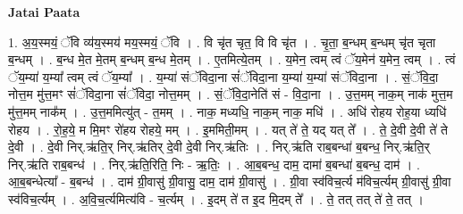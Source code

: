 \documentclass[17pt]{extarticle}
\begin{document}
\textbf{Jatai Paata} \newline

1. अ॒य॒स्मयं॒ ॅवि व्य॑य॒स्मय॑ मय॒स्मयं॒ ॅवि । . वि चृ॑त चृत॒ वि वि चृ॑त । . चृ॒ता॒ ब॒न्धम् ब॒न्धम् चृ॑त चृता ब॒न्धम् । . ब॒न्ध मे॒त मे॒तम् ब॒न्धम् ब॒न्ध मे॒तम् । . ए॒तमित्ये॒तम् । . य॒मेन॒ त्वम् त्वं ॅय॒मेन॑ य॒मेन॒ त्वम् । . त्वं ॅय॒म्या॑ य॒म्या᳚ त्वम् त्वं ॅय॒म्या᳚ । . य॒म्या॑ संॅविदा॒ना सं॑ॅविदा॒ना य॒म्या॑ य॒म्या॑ संॅविदा॒ना । . सं॒ॅवि॒दा॒ नोत्त॒म मु॑त्त॒मꣳ सं॑ॅविदा॒ना सं॑ॅविदा॒ नोत्त॒मम् । . सं॒ॅवि॒दा॒नेति॑ सं - वि॒दा॒ना । . उ॒त्त॒मम् नाक॒म् नाक॑ मुत्त॒म मु॑त्त॒मम् नाक᳚म् । . उ॒त्त॒ममित्यु॑त् - त॒मम् । . नाक॒ मध्यधि॒ नाक॒म् नाक॒ मधि॑ । . अधि॑ रोहय रोह॒या ध्यधि॑ रोहय । . रो॒ह॒ये॒ म मि॒मꣳ रो॑हय रोहये॒ मम् । . इ॒ममिती॒मम् । . यत् ते॑ ते॒ यद् यत् ते᳚ । . ते॒ दे॒वी दे॒वी ते॑ ते दे॒वी । . दे॒वी निर्.ऋ॑ति॒र् निर्.ऋ॑तिर् दे॒वी दे॒वी निर्.ऋ॑तिः । . निर्.ऋ॑ति राब॒बन्धा॑ ब॒बन्ध॒ निर्.ऋ॑ति॒र् निर्.ऋ॑ति राब॒बन्ध॑ । . निर्.ऋ॑ति॒रिति॒ निः - ऋ॒तिः॒ । . आ॒ब॒बन्ध॒ दाम॒ दामा॑ ब॒बन्धा॑ ब॒बन्ध॒ दाम॑ । . आ॒ब॒बन्धेत्या᳚ - ब॒बन्ध॑ । . दाम॑ ग्री॒वासु॑ ग्री॒वासु॒ दाम॒ दाम॑ ग्री॒वासु॑ । . ग्री॒वा स्व॑विच॒र्त्य म॑विच॒र्त्यम् ग्री॒वासु॑ ग्री॒वा स्व॑विच॒र्त्यम् । . अ॒वि॒च॒र्त्यमित्य॑वि - च॒र्त्यम् । . इ॒दम् ते॑ त इ॒द मि॒दम् ते᳚ । . ते॒ तत् तत् ते॑ ते॒ तत् । \newline
\end{document}
